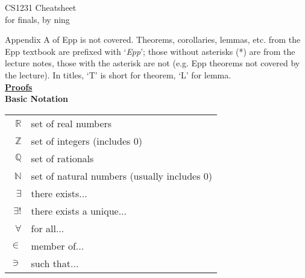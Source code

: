 \documentclass[a4paper]{article}
\newcommand{\heading}[1]{{\small\underline{\textbf{#1}}}}
\newcommand{\subheading}[1]{{\scriptsize\textbf{#1}}}
\begin{document}
\scriptsize                         %
\setlength\parindent{0pt}           %
\setlength{\abovedisplayskip}{3pt}  %
\setlength{\belowdisplayskip}{3pt}  %

\begin{center}
  {\large CS1231 Cheatsheet}\\{for finals, by ning}
\end{center}

\begin{multicols*}{4}

Appendix A of Epp is not covered. Theorems, corollaries, lemmas, etc. from the
Epp textbook are prefixed with `\textit{Epp}'; those without asterisks (*) are
from the lecture notes, those with the asterisk are not (e.g. Epp theorems not
covered by the lecture). In titles, `T' is short for theorem, `L' for lemma.\\

\heading{Proofs} \\

\subheading{Basic Notation}\\

\begin{tabularx}{\columnwidth}{rX}
  $\mathbb{R}$ & set of real numbers \\
  $\mathbb{Z}$ & set of integers (includes $0$) \\
  $\mathbb{Q}$ & set of rationals \\
  $\mathbb{N}$ & set of natural numbers (usually includes $0$) \\
  $\exists$    & there exists... \\
  $\exists!$   & there exists a unique... \\
  $\forall$    & for all... \\
  $\in$        & member of... \\
  $\ni$        & such that... \\
\end{tabularx}\\


\end{multicols*}
\end{document}
